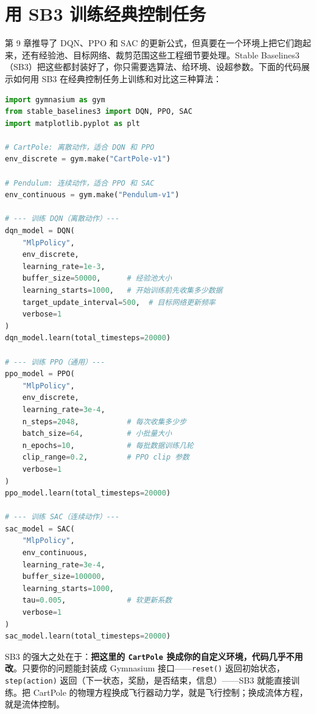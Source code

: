 \section*{用 SB3 训练经典控制任务}

第 9 章推导了 DQN、PPO 和 SAC 的更新公式，但真要在一个环境上把它们跑起来，还有经验池、目标网络、裁剪范围这些工程细节要处理。Stable Baselines3（SB3）把这些都封装好了，你只需要选算法、给环境、设超参数。下面的代码展示如何用 SB3 在经典控制任务上训练和对比这三种算法：

\begin{lstlisting}[language=Python, caption={用 SB3 对比三种算法}]
import gymnasium as gym
from stable_baselines3 import DQN, PPO, SAC
import matplotlib.pyplot as plt

# CartPole: 离散动作，适合 DQN 和 PPO
env_discrete = gym.make("CartPole-v1")

# Pendulum: 连续动作，适合 PPO 和 SAC
env_continuous = gym.make("Pendulum-v1")

# --- 训练 DQN（离散动作）---
dqn_model = DQN(
    "MlpPolicy", 
    env_discrete,
    learning_rate=1e-3,
    buffer_size=50000,      # 经验池大小
    learning_starts=1000,   # 开始训练前先收集多少数据
    target_update_interval=500,  # 目标网络更新频率
    verbose=1
)
dqn_model.learn(total_timesteps=20000)

# --- 训练 PPO（通用）---
ppo_model = PPO(
    "MlpPolicy",
    env_discrete,
    learning_rate=3e-4,
    n_steps=2048,           # 每次收集多少步
    batch_size=64,          # 小批量大小
    n_epochs=10,            # 每批数据训练几轮
    clip_range=0.2,         # PPO clip 参数
    verbose=1
)
ppo_model.learn(total_timesteps=20000)

# --- 训练 SAC（连续动作）---
sac_model = SAC(
    "MlpPolicy",
    env_continuous,
    learning_rate=3e-4,
    buffer_size=100000,
    learning_starts=1000,
    tau=0.005,              # 软更新系数
    verbose=1
)
sac_model.learn(total_timesteps=20000)
\end{lstlisting}

\begin{remark}
SB3 的强大之处在于：\textbf{把这里的 \texttt{CartPole} 换成你的自定义环境，代码几乎不用改}。只要你的问题能封装成 Gymnasium 接口——\texttt{reset()} 返回初始状态，\texttt{step(action)} 返回（下一状态，奖励，是否结束，信息）——SB3 就能直接训练。把 CartPole 的物理方程换成飞行器动力学，就是飞行控制；换成流体方程，就是流体控制。
\end{remark}




